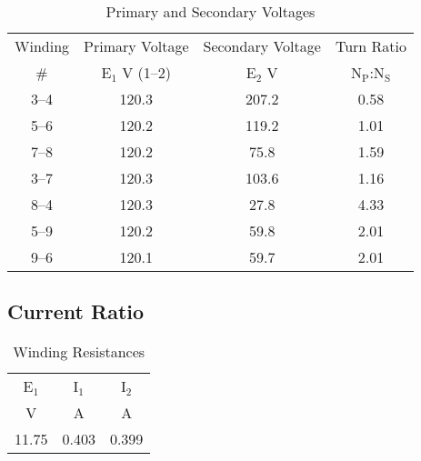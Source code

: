 \documentclass{article}
\begin{document}
\begin{table}[H]
  \centering
  \begin{tabular}{cccc}
    \hline
    Winding & Primary Voltage & Secondary Voltage & Turn Ratio \\
    \# & E$_1$ V (1--2) & E$_2$ V & N$_\text{P}$:N$_\text{S}$\\
    \hline
    3--4 & 120.3 & 207.2 & 0.58 \\
    5--6 & 120.2 & 119.2 & 1.01 \\
    7--8 & 120.2 &  75.8 & 1.59 \\
    3--7 & 120.3 & 103.6 & 1.16 \\
    8--4 & 120.3 &  27.8 & 4.33 \\
    5--9 & 120.2 &  59.8 & 2.01 \\
    9--6 & 120.1 &  59.7 & 2.01 \\
  \end{tabular}
  \caption{Primary and Secondary Voltages}
  \label{tab:volt_rat}
\end{table}

\subsection{Current Ratio}
\begin{table}[H]
  \centering
  \begin{tabular}{ccc}
    \hline
    E$_1$ & I$_1$ & I$_2$ \\
    V & A & A \\
    \hline
    11.75 & 0.403 & 0.399 \\
  \end{tabular}
  \caption{Winding Resistances}
  \label{tab:curr_rat}
\end{table}
\end{document}
